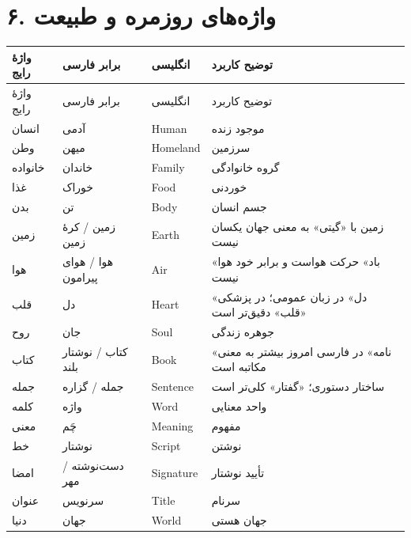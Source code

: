\documentclass[a4paper,12pt,openany]{book}
\begin{document}
\section*{۶. واژه‌های روزمره و طبیعت}
\begingroup
\small
\setlength{\tabcolsep}{4pt}
\renewcommand{\arraystretch}{1.25}
\begin{longtable}{|p{2.5cm}|p{4.0cm}|p{2.3cm}|p{5.3cm}|}
\hline
واژهٔ رایج & برابر فارسی & انگلیسی & توضیح کاربرد \\
\hline
\endfirsthead
\hline
واژهٔ رایج & برابر فارسی & انگلیسی & توضیح کاربرد \\
\hline
\endhead
انسان & آدمی & \textenglish{Human} & موجود زنده \\
وطن & میهن & \textenglish{Homeland} & سرزمین \\
خانواده & خاندان & \textenglish{Family} & گروه خانوادگی \\
غذا & خوراک & \textenglish{Food} & خوردنی \\
بدن & تن & \textenglish{Body} & جسم انسان \\
زمین & زمین / کرهٔ زمین & \textenglish{Earth} & زمین با «گیتی» به معنی جهان یکسان نیست \\
هوا & هوا / هوای پیرامون & \textenglish{Air} & «باد» حرکت هواست و برابر خود هوا نیست \\
قلب & دل & \textenglish{Heart} & «دل» در زبان عمومی؛ در پزشکی «قلب» دقیق‌تر است \\
روح & جان & \textenglish{Soul} & جوهره زندگی \\
کتاب & کتاب / نوشتار بلند & \textenglish{Book} & «نامه» در فارسی امروز بیشتر به معنی مکاتبه است \\
جمله & جمله / گزاره & \textenglish{Sentence} & ساختار دستوری؛ «گفتار» کلی‌تر است \\
کلمه & واژه & \textenglish{Word} & واحد معنایی \\
معنی & چَم & \textenglish{Meaning} & مفهوم \\
خط & نوشتار & \textenglish{Script} & نوشتن \\
امضا & دست‌نوشته / مهر & \textenglish{Signature} & تأیید نوشتار \\
عنوان & سرنویس & \textenglish{Title} & سرنام \\
دنیا & جهان & \textenglish{World} & جهان هستی \\
\hline
\end{longtable}
\endgroup
\end{document}
